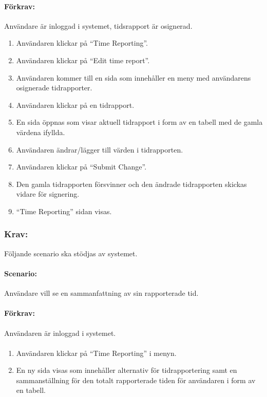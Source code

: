 \documentclass[paper=a4, fontsize=11pt,twoside]{article}
\begin{document}
\paragraph{Förkrav:}
Användare är inloggad i systemet, tidsrapport är osignerad.
 \begin{enumerate}
 \item Användaren klickar på “Time Reporting”.
 \item	Användaren klickar på “Edit time report”.
 \item	Användaren kommer till en sida som innehåller en meny med användarens osignerade tidrapporter.
 \item 	Användaren klickar på en tidrapport.
 \item	En sida öppnas som visar aktuell tidrapport i form av en tabell med de gamla värdena ifyllda.
 \item	Användaren ändrar/lägger till värden i tidrapporten.
 \item	Användaren klickar på “Submit Change”.
 \item	Den gamla tidrapporten försvinner och den ändrade tidrapporten skickas vidare för signering.
 \item	“Time Reporting” sidan visas.
 	
 \end{enumerate}
 \subsubsection*{Krav:}Följande scenario ska stödjas av systemet.
 \paragraph{Scenario:}Användare vill se en sammanfattning av sin rapporterade tid.
 \paragraph{Förkrav:}
 Användaren är inloggad i systemet.
 \paragraph{}
 \begin{enumerate}
\item  Användaren klickar på “Time Reporting” i menyn.
\item  En ny sida visas som innehåller alternativ för tidrapportering samt en sammanställning för den totalt rapporterade tiden för användaren i form av en tabell.

 \end{enumerate}
\end{document}
